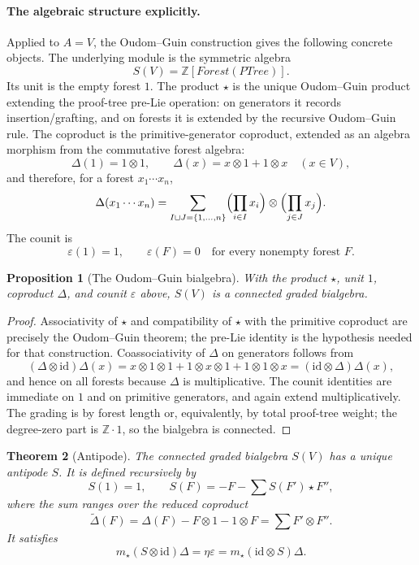 \documentclass[11pt]{article}
\newtheorem{theorem}{Theorem}
\newtheorem{proposition}[theorem]{Proposition}
\newcommand{\PTree}{\mathit{PTree}}
\newcommand{\Forest}{\mathit{Forest}}
\newcommand{\ZZ}{\mathbb{Z}}
\begin{document}
\paragraph{The algebraic structure explicitly.}
Applied to \(A=V\), the Oudom--Guin construction gives the following concrete
objects.  The underlying module is the symmetric algebra
\[
S(V)=\ZZ[\Forest(\PTree)].
\]
Its unit is the empty forest \(1\).  The product \(\star\) is the unique
Oudom--Guin product extending the proof-tree pre-Lie operation: on generators
it records insertion/grafting, and on forests it is extended by the recursive
Oudom--Guin rule.  The coproduct is the primitive-generator coproduct,
extended as an algebra morphism from the commutative forest algebra:
\[
\Delta(1)=1\otimes 1,
\qquad
\Delta(x)=x\otimes 1+1\otimes x
\quad(x\in V),
\]
and therefore, for a forest \(x_1\cdots x_n\),
\[
\Delta(x_1\cdots x_n)
=
\sum_{I\sqcup J=\{1,\ldots,n\}}
\Bigl(\prod_{i\in I}x_i\Bigr)\otimes
\Bigl(\prod_{j\in J}x_j\Bigr).
\]
The counit is
\[
\varepsilon(1)=1,\qquad
\varepsilon(F)=0
\quad\text{for every nonempty forest }F.
\]

\begin{proposition}[The Oudom--Guin bialgebra]
With the product \(\star\), unit \(1\), coproduct \(\Delta\), and counit
\(\varepsilon\) above, \(S(V)\) is a connected graded bialgebra.
\end{proposition}

\begin{proof}
Associativity of \(\star\) and compatibility of \(\star\) with the primitive
coproduct are precisely the Oudom--Guin theorem; the pre-Lie identity is the
hypothesis needed for that construction.  Coassociativity of \(\Delta\) on
generators follows from
\[
(\Delta\otimes \mathrm{id})\Delta(x)
=x\otimes 1\otimes 1+1\otimes x\otimes 1+1\otimes 1\otimes x
=(\mathrm{id}\otimes\Delta)\Delta(x),
\]
and hence on all forests because \(\Delta\) is multiplicative.  The counit
identities are immediate on \(1\) and on primitive generators, and again
extend multiplicatively.  The grading is by forest length or, equivalently,
by total proof-tree weight; the degree-zero part is \(\ZZ\cdot 1\), so the
bialgebra is connected.
\end{proof}

\begin{theorem}[Antipode]
The connected graded bialgebra \(S(V)\) has a unique antipode \(S\).  It is
defined recursively by
\[
S(1)=1,
\qquad
S(F)=-F-\sum S(F')\star F'',
\]
where the sum ranges over the reduced coproduct
\[
\widetilde{\Delta}(F)
=\Delta(F)-F\otimes 1-1\otimes F
=\sum F'\otimes F''.
\]
It satisfies
\[
m_\star(S\otimes \mathrm{id})\Delta
=
\eta\varepsilon
=
m_\star(\mathrm{id}\otimes S)\Delta.
\]
\end{theorem}
\end{document}
